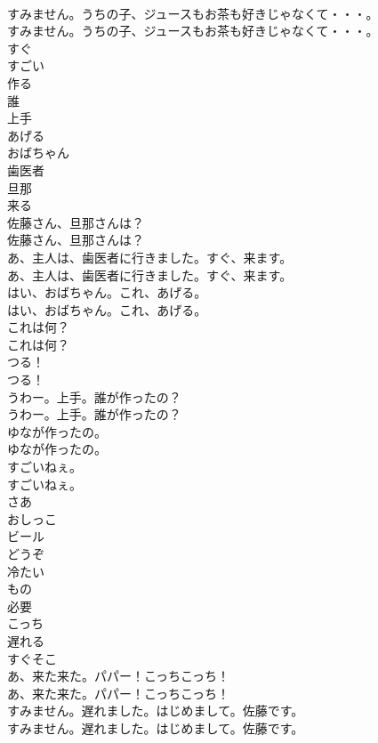 \documentclass[8pt]{extreport}
\begin{document}
\begin{CJK}{UTF8}{min}
\\	すみません。うちの子、ジュースもお茶も好きじゃなくて・・・。	
\\	すみません。うちの子、ジュースもお茶も好きじゃなくて・・・。 
\\	すぐ
\\	すごい
\\	作る
\\	誰
\\	上手
\\	あげる
\\	おばちゃん
\\	歯医者
\\	旦那
\\	来る
\\	佐藤さん、旦那さんは？	
\\	佐藤さん、旦那さんは？ 
\\	あ、主人は、歯医者に行きました。すぐ、来ます。	
\\	あ、主人は、歯医者に行きました。すぐ、来ます。 
\\	はい、おばちゃん。これ、あげる。	
\\	はい、おばちゃん。これ、あげる。 
\\	これは何？	
\\	これは何？ 
\\	つる！	
\\	つる！ 
\\	うわー。上手。誰が作ったの？	
\\	うわー。上手。誰が作ったの？ 
\\	ゆなが作ったの。	
\\	ゆなが作ったの。 
\\	すごいねぇ。	
\\	すごいねぇ。 
\\	さあ
\\	おしっこ
\\	ビール
\\	どうぞ
\\	冷たい
\\	もの
\\	必要
\\	こっち
\\	遅れる
\\	すぐそこ
\\	あ、来た来た。パパー！こっちこっち！	
\\	あ、来た来た。パパー！こっちこっち！ 
\\	すみません。遅れました。はじめまして。佐藤です。	
\\	すみません。遅れました。はじめまして。佐藤です。 

\end{CJK}
\end{document}
